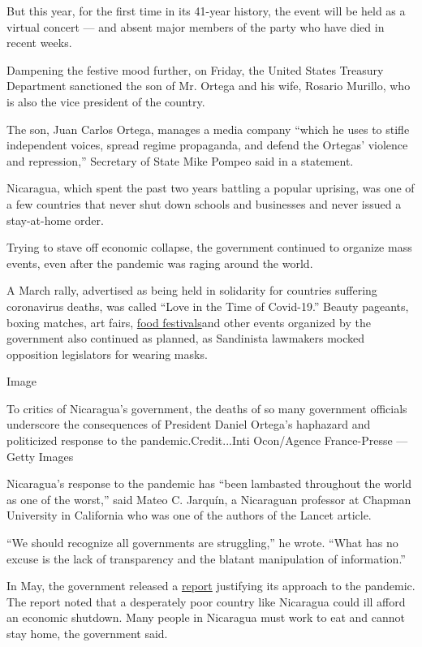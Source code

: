 But this year, for the first time in its 41-year history, the event will
be held as a virtual concert --- and absent major members of the party
who have died in recent weeks.

Dampening the festive mood further, on Friday, the United States
Treasury Department sanctioned the son of Mr. Ortega and his wife,
Rosario Murillo, who is also the vice president of the country.

The son, Juan Carlos Ortega, manages a media company ``which he uses to
stifle independent voices, spread regime propaganda, and defend the
Ortegas' violence and repression,'' Secretary of State Mike Pompeo said
in a statement.

Nicaragua, which spent the past two years battling a popular uprising,
was one of a few countries that never shut down schools and businesses
and never issued a stay-at-home order.

Trying to stave off economic collapse, the government continued to
organize mass events, even after the pandemic was raging around the
world.

A March rally, advertised as being held in solidarity for countries
suffering coronavirus deaths, was called ``Love in the Time of
Covid-19.'' Beauty pageants, boxing matches, art fairs,
\href{https://www.el19digital.com/articulos/ver/titulo:102052-festival-de-comidas-de-cuaresma-que-promueve-intur-finalizo-con-exito-en-somoto}{food
festivals}and other events organized by the government also continued as
planned, as Sandinista lawmakers mocked opposition legislators for
wearing masks.

Image

To critics of Nicaragua's government, the deaths of so many government
officials underscore the consequences of President Daniel Ortega's
haphazard and politicized response to the pandemic.Credit...Inti
Ocon/Agence France-Presse --- Getty Images

Nicaragua's response to the pandemic has ``been lambasted throughout the
world as one of the worst,'' said Mateo C. Jarquín, a Nicaraguan
professor at Chapman University in California who was one of the authors
of the Lancet article.

``We should recognize all governments are struggling,'' he wrote. ``What
has no excuse is the lack of transparency and the blatant manipulation
of information.''

In May, the government released a
\href{https://www.el19digital.com/articulos/ver/titulo:103696-al-pueblo-de-nicaragua-y-al-mundo-informe-sobre-el-covid-19-y-una-estrategia-singular-libro-blanco}{report}
justifying its approach to the pandemic. The report noted that a
desperately poor country like Nicaragua could ill afford an economic
shutdown. Many people in Nicaragua must work to eat and cannot stay
home, the government said.

